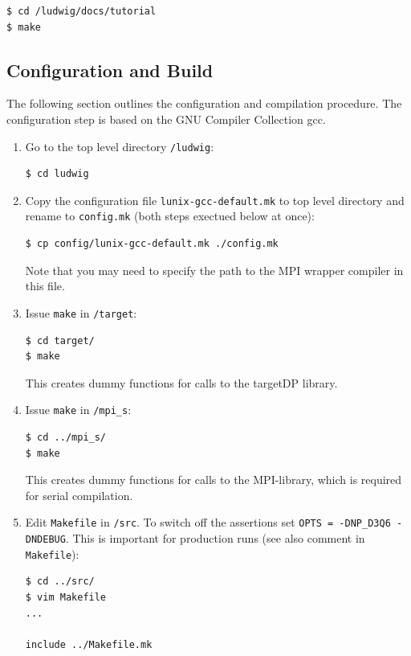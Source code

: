 \documentclass[11pt,twoside,a4paper]{article}
\begin{document}
\begin{lstlisting}[style=terminalverbatim]
$ cd /ludwig/docs/tutorial
$ make
\end{lstlisting}

\subsection{Configuration and Build}\label{configbuild}

The following section outlines the configuration and compilation 
procedure. The configuration step is based on the GNU Compiler Collection gcc.

\begin{enumerate}
\item Go to the top level directory \texttt{/ludwig}: \\
\begin{lstlisting}
$ cd ludwig
\end{lstlisting}
\item Copy the configuration file \texttt{lunix-gcc-default.mk} to top level directory 
and rename to \texttt{config.mk} (both steps exectued below at once): \\
\begin{lstlisting}
$ cp config/lunix-gcc-default.mk ./config.mk
\end{lstlisting}
Note that you may need to specify the path to the MPI wrapper compiler in this file.
\item Issue \texttt{make} in \texttt{/target}: \\
\begin{lstlisting}
$ cd target/
$ make 
\end{lstlisting}
This creates dummy functions for calls to the targetDP library.
\item Issue \texttt{make} in \texttt{/mpi\_s}: \\
\begin{lstlisting}
$ cd ../mpi_s/
$ make 
\end{lstlisting}
This creates dummy functions for calls to the MPI-library,
which is required for serial compilation.
\item Edit \texttt{Makefile} in \texttt{/src}. To switch off 
the assertions set \texttt{OPTS = -DNP\_D3Q6 -DNDEBUG}. This is
important for production runs (see also comment in \texttt{Makefile}): \\
\begin{lstlisting}
$ cd ../src/
$ vim Makefile
...

include ../Makefile.mk


\end{lstlisting}
\end{enumerate}
\end{document}
